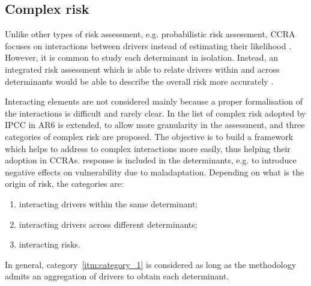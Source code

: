 \subsection{Complex risk}
\label{sec:Complex risk}
Unlike other types of risk assessment, e.g. probabilistic risk assessment, \gls{CCRA} focuses on interactions between \glspl{driver} instead of estimating their likelihood \cite[20-21]{2017GIZRiskSupplement}. However, it is common to study each \gls{determinant} in isolation. Instead, an integrated risk assessment which is able to relate \glspl{driver} within and across \glspl{determinant} would be able to describe the overall \gls{risk} more accurately \cite[145-147]{2022BegumPointOf}.

Interacting elements are not considered mainly because a proper formalisation of the interactions is difficult and rarely clear. In \cite{2021SimpsonAFramework} the list of complex \gls{risk} adopted by \gls{IPCC} in \gls{AR6} is extended, to allow more granularity in the assessment, and three categories of complex \gls{risk} are proposed. The objective is to build a framework which helps to address to complex interactions more easily, thus helping their adoption in \glspl{CCRA}. \Gls{response} is included in the \glspl{determinant}, e.g. to introduce negative effects on \gls{vulnerability} due to \gls{maladaptation}.
Depending on what is the origin of \gls{risk}, the categories are:\cite[493]{2021SimpsonAFramework}
\begin{enumerate}
  \item \label{itm:category_1} interacting \glspl{driver} within the same \gls{determinant};
  \item \label{itm:category_2} interacting \glspl{driver} across different \glspl{determinant};
  \item \label{itm:category_3} interacting \glspl{risk}.
\end{enumerate}
In general, category~\ref{itm:category_1} is considered as long as the methodology admits an aggregation of \glspl{driver} to obtain each \gls{determinant}.
